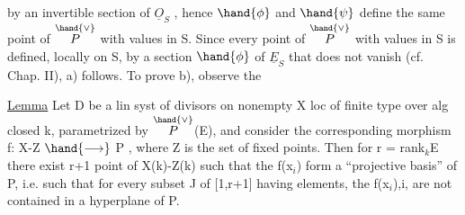 
by an invertible section of $\underline{O}_S$ , hence $\hand{\phi}$ and $\hand{\psi}$ define the same point
of $\overset{\hand{\vee}}{P}$ with values in S. Since every point of $\overset{\hand{\vee}}{P}$ with values in S is defined,
locally on S, by a section $\hand{\phi}$ of $\underline{E}_S$ that does not vanish (cf. Chap. II),
a) follows.   To prove b), observe the

\uline{Lemma}   Let D be a lin syst of divisors on nonempty X loc of finite type
over alg closed k, parametrized by $\overset{\hand{\vee}}{P}$(E), and consider the corresponding
morphism f: X-Z $\hand{\longrightarrow}$ P , where Z is the set of fixed points. Then  for
r = rank$_k$E  there exist r+1 point of  X(k)-Z(k) such that the
f(x$_i$) form a ``projective basis'' of P, i.e. such that for every
subset J of [1,r+1] having   elements, the f(x$_i$),i,  are not
contained in a hyperplane of P.

